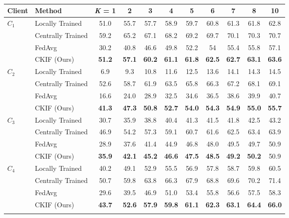 \begin{table}[t]
    \setlength{\tabcolsep}{5pt}
    \centering
    \caption{}
    \label{tab:t_rt_1}
    \begin{tabular}{llccccccccc}
    \toprule
    Client       & Method                     & \textit{K} = 1 & 2    & 3    & 4   & 5  & 6  & 7 & 8 & 10 \\ \midrule
    $C_1$ & Locally Trained   & 51.0 & 55.7 & 57.7 & 58.9 & 59.7 & 60.8 & 61.3 & 61.8 & 62.8 \\
                   & Centrally Trained & 59.2 & 65.2 & 67.1 & 68.2 & 69.2 & 69.7 & 70.1 & 70.3 & 70.7 \\
                   & FedAvg   & 30.2 & 40.8 & 46.6 & 49.8 & 52.2 & 54 & 55.4 & 55.8 & 57.1 \\
                   & CKIF (Ours)     & \textbf{51.2} & \textbf{57.1} & \textbf{60.2} & \textbf{61.1} & \textbf{61.8} & \textbf{62.5} & \textbf{62.7} & \textbf{63.1} & \textbf{63.6} \\
    \midrule
    $C_2$ & Locally Trained   & 6.9 & 9.3 & 10.8 & 11.6 & 12.5 & 13.6 & 14.1 & 14.3 & 14.5 \\
                   & Centrally Trained & 52.6 & 58.7 & 61.9 & 63.5 & 65.8 & 66.3 & 67.2 & 68.1 & 69.1 \\
                   & FedAvg   & 16.6 & 24.0 & 28.9 & 32.5 & 34.6 & 36.5 & 38.6 & 39.9 & 40.7 \\
                   & CKIF (Ours)     & \textbf{41.3} & \textbf{47.3} & \textbf{50.8} & \textbf{52.7} & \textbf{54.0} & \textbf{54.3} & \textbf{54.9} & \textbf{55.0} & \textbf{55.7} \\
    \midrule
    $C_3$ & Locally Trained   & 30.7 & 35.9 & 38.8 & 40.4 & 41.3 & 41.5 & 41.8 & 42.5 & 43.2 \\
                   & Centrally Trained & 46.9 & 54.2 & 57.3 & 59.1 & 60.7 & 61.6 & 62.5 & 63.4 & 63.9 \\
                   & FedAvg   & 28.9 & 37.6 & 41.4 & 44.9 & 46.8 & 48.0 & 49.5 & 49.7 & 50.9 \\
                   & CKIF (Ours)     & \textbf{35.9} & \textbf{42.1} & \textbf{45.2} & \textbf{46.6} & \textbf{47.5} & \textbf{48.5} & \textbf{49.2} & \textbf{50.2} & 50.9 \\
    \midrule
    $C_4$ & Locally Trained   & 40.2 & 49.1 & 52.9 & 55.5 & 56.9 & 57.8 & 58.7 & 59.8 & 60.5 \\
                   & Centrally Trained & 50.7 & 59.8 & 63.8 & 66.3 & 67.9 & 68.8 & 69.6 & 70.2 & 71.4 \\
                   & FedAvg   & 29.6 & 39.5 & 46.9 & 51.0 & 53.4 & 55.8 & 56.6 & 57.5 & 58.3 \\
                   & CKIF (Ours)     & \textbf{43.7} & \textbf{52.6} & \textbf{57.9} & \textbf{59.8} & \textbf{61.1} & \textbf{62.3} & \textbf{63.1} & \textbf{64.4} & \textbf{66.0} \\
    \botrule
    \end{tabular}
\end{table}

